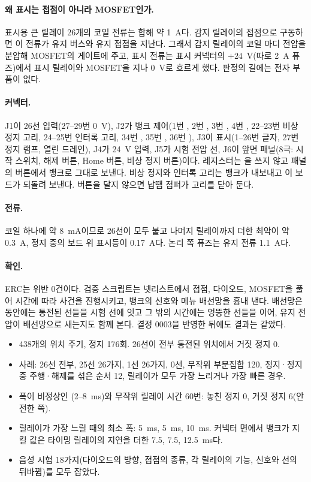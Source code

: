 \paragraph{왜 표시는 접점이 아니라 MOSFET인가.} 표시용 큰 릴레이 26개의 코일 전류는 합해 약 1~A다. 감지
릴레이의 접점으로 구동하면 이 전류가 유지 버스와 유지 접점을 지난다. 그래서 감지 릴레이의 코일 마디 전압을
분압해 MOSFET의 게이트에 주고, 표시 전류는 표시 커넥터의 $+24$~V(따로 2~A 퓨즈)에서 표시 릴레이와 MOSFET을
지나 0~V로 흐르게 했다. 판정의 길에는 전자 부품이 없다.

\paragraph{커넥터.} J1이 26선 입력(27--29번 0~V), J2가 뱅크 제어(1번 , 2번 , 3번
, 4번 , 22--23번 비상 정지 고리, 24--25번 인터록 고리, 34번 , 35번
, 36번 ), J3이 표시(1--26번 글자, 27번 정지 램프, 열린 드레인), J4가 24~V 입력, J5가
시험 전압 선, J6이 앞면 패널(8극: 시작 스위치, 해제 버튼, Home 버튼, 비상 정지 버튼)이다. 레지스터는 을
쓰지 않고 패널의 버튼에서 뱅크로 그대로 보낸다. 비상 정지와 인터록 고리는 뱅크가 내보내고 이 보드가 되돌려
보낸다. 버튼을 달지 않으면 납땜 점퍼가 고리를 닫아 둔다.

\paragraph{전류.} 코일 하나에 약 8~mA이므로 26선이 모두 붙고 나머지 릴레이까지 더한 최악이 약 0.3~A, 정지 중의
보드 위 표시등이 0.17~A다. 논리 쪽 퓨즈는 유지 전류 1.1~A다.

\paragraph{확인.} ERC는 위반 0건이다. 검증 스크립트는 넷리스트에서 접점, 다이오드, MOSFET을 풀어 시간에 따라
사건을 진행시키고, 뱅크의 신호와 메뉴 배선망을 흉내 낸다. 배선망은  동안에는 통전된 선들을 시험
선에 잇고 그 밖의 시간에는 엉뚱한 선들을 이어, 유지 전압이 배선망으로 새는지도 함께 본다. 결정 0003을 반영한
뒤에도 결과는 같았다.

\begin{itemize}
\item 438개의 위치 주기, 정지 176회. 26선이 전부 통전된 위치에서 거짓 정지 0.
\item 사례: 26선 전부, 25선 26가지, 1선 26가지, 0선, 무작위 부분집합 120, 정지·정지 중 주행·해제를 섞은 순서 12,
릴레이가 모두 가장 느리거나 가장 빠른 경우.
\item 폭이 비정상인 (2--8~ms)와 무작위 릴레이 시간 60번: 놓친 정지 0, 거짓 정지 6(안전한 쪽).
\item 릴레이가 가장 느릴 때의 최소 폭:  5~ms,  5~ms,  10~ms. 커넥터 면에서
뱅크가 지킬 값은 타이밍 릴레이의 지연을 더한 7.5, 7.5, 12.5~ms다.
\item 음성 시험 18가지(다이오드의 방향, 접점의 종류, 각 릴레이의 기능, 신호와 선의 뒤바뀜)를 모두 잡았다.
\end{itemize}

